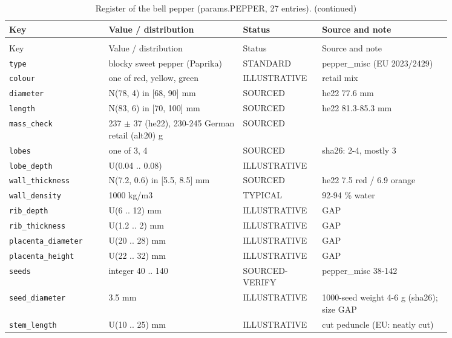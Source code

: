 \documentclass[10.5pt,a4paper]{article}
\begin{document}
{\scriptsize\begin{longtable}{@{}p{0.2\linewidth}p{0.27\linewidth}p{0.12\linewidth}p{0.26\linewidth}@{}}\caption{Register of the bell pepper (params.PEPPER, 27 entries).}\\\toprule Key & Value / distribution & Status & Source and note \\\midrule\endfirsthead
\caption[]{Register of the bell pepper (params.PEPPER, 27 entries). (continued)}\\\toprule Key & Value / distribution & Status & Source and note \\\midrule\endhead
\texttt{type} & blocky sweet pepper (Paprika) & STANDARD & pepper\_misc (EU 2023/2429) \\
\texttt{colour} & one of red, yellow, green & ILLUSTRATIVE & retail mix \\
\texttt{diameter} & N(78, 4) in [68, 90] mm & SOURCED & he22 77.6 mm \\
\texttt{length} & N(83, 6) in [70, 100] mm & SOURCED & he22 81.3-85.3 mm \\
\texttt{mass\_\allowbreak{}check} & 237 $\pm$ 37 (he22), 230-245 German retail (alt20) g & SOURCED &  \\
\texttt{lobes} & one of 3, 4 & SOURCED & sha26: 2-4, mostly 3 \\
\texttt{lobe\_\allowbreak{}depth} & U(0.04 .. 0.08) & ILLUSTRATIVE &  \\
\texttt{wall\_\allowbreak{}thickness} & N(7.2, 0.6) in [5.5, 8.5] mm & SOURCED & he22 7.5 red / 6.9 orange \\
\texttt{wall\_\allowbreak{}density} & 1000 kg/m3 & TYPICAL & 92-94 \% water \\
\texttt{rib\_\allowbreak{}depth} & U(6 .. 12) mm & ILLUSTRATIVE & GAP \\
\texttt{rib\_\allowbreak{}thickness} & U(1.2 .. 2) mm & ILLUSTRATIVE & GAP \\
\texttt{placenta\_\allowbreak{}diameter} & U(20 .. 28) mm & ILLUSTRATIVE & GAP \\
\texttt{placenta\_\allowbreak{}height} & U(22 .. 32) mm & ILLUSTRATIVE & GAP \\
\texttt{seeds} & integer 40 .. 140 & SOURCED-VERIFY & pepper\_misc 38-142 \\
\texttt{seed\_\allowbreak{}diameter} & 3.5 mm & ILLUSTRATIVE & 1000-seed weight 4-6 g (sha26); size GAP \\
\texttt{stem\_\allowbreak{}length} & U(10 .. 25) mm & ILLUSTRATIVE & cut peduncle (EU: neatly cut) \\

\end{longtable}}
\end{document}

